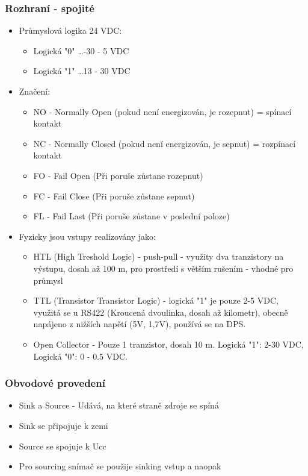 \subsubsection*{Rozhraní - spojité}
\begin{itemize}
    \item Průmyslová logika 24 VDC: \begin{itemize}
              \item Logická "0" \dots -30 - 5 VDC
              \item Logická "1" \dots 13 - 30 VDC
          \end{itemize}
    \item Značení: \begin{itemize}
              \item NO - Normally Open (pokud není energizován, je rozepnut) = spínací kontakt
              \item NC - Normally Closed (pokud není energizován, je sepnut) = rozpínací kontakt
              \item FO - Fail Open (Při poruše zůstane rozepnut)
              \item FC - Fail Close (Při poruše zůstane sepnut)
              \item FL - Fail Last (Při poruše zůstane v poslední poloze)
          \end{itemize}
    \item Fyzicky jsou vstupy realizovány jako: \begin{itemize}
              \item HTL (High Treshold Logic) - push-pull - využity dva tranzistory na výstupu, dosah až 100 m, pro prostředí s větším rušením - vhodné pro průmysl
              \item TTL (Transistor Transistor Logic) - logická "1" je pouze 2-5 VDC, využitá se u RS422 (Kroucená dvoulinka, dosah až kilometr), obecně napájeno z nižších napětí (5V, 1,7V), používá se na DPS.
              \item Open Collector - Pouze 1 tranzistor, dosah 10 m. Logická "1": 2-30 VDC, Logická "0": 0 - 0.5 VDC.
          \end{itemize}
\end{itemize}

\subsubsection*{Obvodové provedení}
\begin{itemize}
    \item Sink a Source - Udává, na které straně zdroje se spíná
    \item Sink se připojuje k zemi
    \item Source se spojuje k Ucc
    \item Pro sourcing snímač se použije sinking vstup a naopak
\end{itemize}

